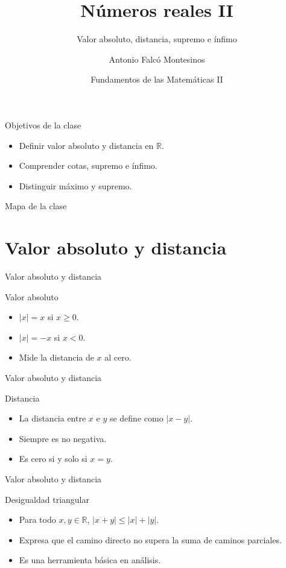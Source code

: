 \documentclass[aspectratio=169,11pt]{beamer}
\title[FdM II -- Clase 14]{Números reales II}
\subtitle{Valor absoluto, distancia, supremo e ínfimo}
\author{Antonio Falcó Montesinos}
\institute{Universidad CEU Cardenal Herrera}
\date{Fundamentos de las Matemáticas II}
\begin{document}
\begin{frame}
  \titlepage
\end{frame}

\begin{frame}{Objetivos de la clase}
\begin{itemize}
  \item Definir valor absoluto y distancia en \(\mathbb{R}\).
  \item Comprender cotas, supremo e ínfimo.
  \item Distinguir máximo y supremo.
\end{itemize}
\end{frame}

\begin{frame}{Mapa de la clase}
\tableofcontents
\end{frame}

\section{Valor absoluto y distancia}

\begin{frame}{Valor absoluto y distancia}
\begin{block}{Valor absoluto}
\begin{itemize}
  \item \(|x|=x\) si \(x\geq 0\).
  \item \(|x|=-x\) si \(x<0\).
  \item Mide la distancia de \(x\) al cero.
\end{itemize}
\end{block}
\end{frame}

\begin{frame}{Valor absoluto y distancia}
\begin{block}{Distancia}
\begin{itemize}
  \item La distancia entre \(x\) e \(y\) se define como \(|x-y|\).
  \item Siempre es no negativa.
  \item Es cero si y solo si \(x=y\).
\end{itemize}
\end{block}
\end{frame}

\begin{frame}{Valor absoluto y distancia}
\begin{block}{Desigualdad triangular}
\begin{itemize}
  \item Para todo \(x,y\in\mathbb{R}\), \(|x+y|\leq |x|+|y|\).
  \item Expresa que el camino directo no supera la suma de caminos parciales.
  \item Es una herramienta básica en análisis.
\end{itemize}
\end{block}
\end{frame}
\end{document}
